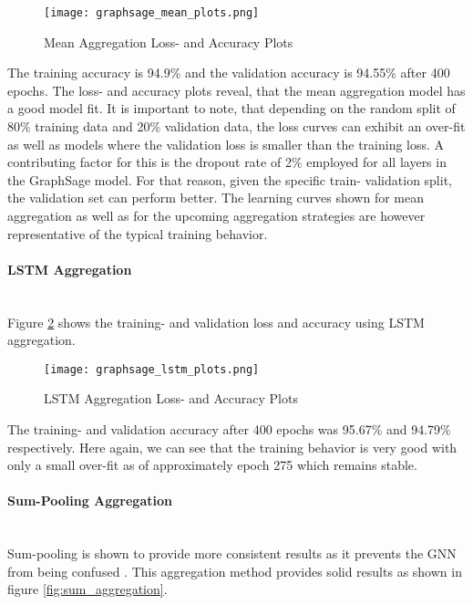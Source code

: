  \begin{figure}[h]
		\centering
		\texttt{[image: graphsage\_mean\_plots.png]}
		\caption{Mean Aggregation Loss- and Accuracy Plots}
        \label{fig:mean_aggregation}
  \end{figure}

  \noindent The training accuracy is 94.9\% and the validation accuracy is 
  94.55\% after 400 epochs. The loss- and accuracy plots reveal, that the 
  mean aggregation model has a good model fit. It is important to note, that
  depending on the random split of 80\% training data and 20\% validation data,
  the loss curves can exhibit an over-fit as well as models where the
  validation loss is smaller than the training loss. A contributing factor for
  this is the dropout rate of 2\% employed for all layers in the GraphSage
  model. For that reason, given the specific train- validation split, the
  validation set can perform better. The learning curves shown for mean
  aggregation as well as for the upcoming aggregation strategies are however
  representative of the typical training behavior. 

  \paragraph{LSTM Aggregation}  \mbox{}\\ 
  Figure \ref{fig:lstm_aggregation} shows the training- and validation loss
  and accuracy using LSTM aggregation. 

  \begin{figure}[h]
		\centering
		\texttt{[image: graphsage\_lstm\_plots.png]}
		\caption{LSTM Aggregation Loss- and Accuracy Plots}
        \label{fig:lstm_aggregation}
  \end{figure}

  \noindent The training- and validation accuracy after 400 epochs was 95.67\% 
  and 94.79\% respectively. Here again, we can see that the training behavior
  is very good with only a small over-fit as of approximately epoch 275 which
  remains stable. 

  \paragraph{Sum-Pooling Aggregation}  \mbox{}\\ 
  Sum-pooling is shown to provide more consistent results as it prevents the
  GNN from being confused \citep{xu2018powerful}. This aggregation method 
  provides solid results as shown in figure \ref{fig:sum_aggregation}. 

